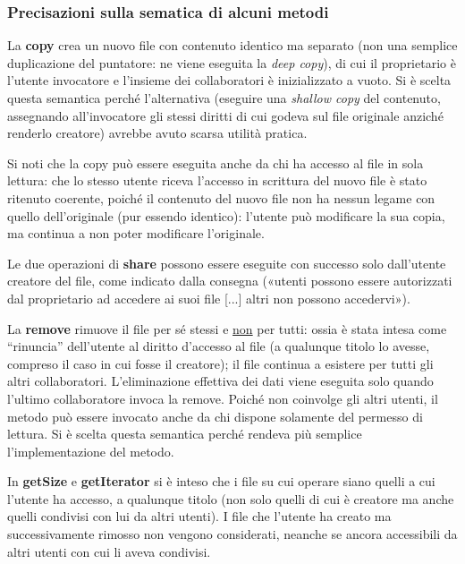 \documentclass[a4paper,10pt]{article}
\begin{document}
 \vspace{-0.3cm}
 \subsubsection*{ Precisazioni sulla sematica di alcuni metodi }
 \vspace{-0.1cm}
 
 La \textbf{copy} crea un nuovo file con contenuto identico ma separato (non una semplice duplicazione del puntatore: ne viene eseguita la \textit{deep copy}), di cui il proprietario è l'utente invocatore e l'insieme dei collaboratori è inizializzato a vuoto. Si è scelta questa semantica perché l'alternativa (eseguire una \textit{shallow copy} del contenuto, assegnando all'invocatore gli stessi diritti di cui godeva sul file originale anziché renderlo creatore) avrebbe avuto scarsa utilità pratica.
 
 Si noti che la copy può essere eseguita anche da chi ha accesso al file in sola lettura: che lo stesso utente riceva l'accesso in scrittura del nuovo file è stato ritenuto coerente, poiché il contenuto del nuovo file non ha nessun legame con quello dell'originale (pur essendo identico): l'utente può modificare la sua copia, ma continua a non poter modificare l'originale.
 
 Le due operazioni di \textbf{share} possono essere eseguite con successo solo dall'utente creatore del file, come indicato dalla consegna («utenti possono essere autorizzati dal proprietario ad accedere ai suoi file [...] altri non possono accedervi»).
 
 La \textbf{remove} rimuove il file per sé stessi e \underline{non} per tutti: ossia è stata intesa come ``rinuncia'' dell'utente al diritto d'accesso al file (a qualunque titolo lo avesse, compreso il caso in cui fosse il creatore); il file continua a esistere per tutti gli altri collaboratori. L'eliminazione effettiva dei dati viene eseguita solo quando l'ultimo collaboratore invoca la remove. Poiché non coinvolge gli altri utenti, il metodo può essere invocato anche da chi dispone solamente del permesso di lettura. Si è scelta questa semantica perché rendeva più semplice l'implementazione del metodo.
 
 In \textbf{getSize} e \textbf{getIterator} si è inteso che i file su cui operare siano quelli a cui l'utente ha accesso, a qualunque titolo (non solo quelli di cui è creatore ma anche quelli condivisi con lui da altri utenti). I file che l'utente ha creato ma successivamente rimosso non vengono considerati, neanche se ancora accessibili da altri utenti con cui li aveva condivisi.
 
\end{document}
